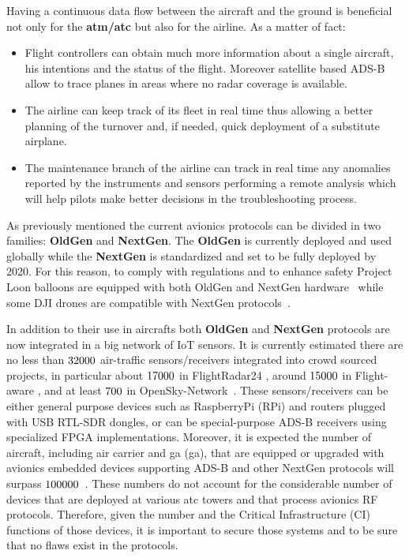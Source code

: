 \documentclass[../main.tex]{subfiles}
\begin{document}
Having a continuous data flow between the aircraft and the ground is beneficial not only for the \textbf{\acrshort{atm}/\acrshort{atc}} but also for the airline. As a matter of fact:
\begin{itemize}
  \item Flight controllers can obtain much more information about a single aircraft, his intentions and the status of the flight. Moreover satellite based ADS-B allow to trace planes in areas where no radar coverage is available.
  \item The airline can keep track of its fleet in real time thus allowing a better planning of the turnover and, if needed, quick deployment of a substitute airplane.
  \item The maintenance branch of the airline can track in real time any anomalies reported by the instruments and sensors performing a remote analysis which will help pilots make better decisions in the troubleshooting process.
\end{itemize}

As previously mentioned the current avionics protocols can be divided in two
families: \textbf{OldGen} and \textbf{NextGen}. The \textbf{OldGen} is currently
deployed and used globally while the \textbf{NextGen} is standardized and set to
be fully deployed by 2020. For this reason, to comply with regulations and to
enhance safety Project Loon balloons are equipped with both OldGen and NextGen
hardware~\cite{loonadsb} while some DJI drones are compatible with NextGen
protocols~\cite{dji}.

In addition to their use in aircrafts both \textbf{OldGen} and \textbf{NextGen} protocols are now
integrated in a big network of IoT sensors. It is currently estimated there are
no less than $32000$ air-traffic sensors/receivers integrated into
crowd sourced projects, in particular about $17000$ in
FlightRadar24 \cite{countFRadar}, around $15000$ in Flight-aware
\cite{countFAware}, and at least $700$ in
OpenSky-Network~\cite{schafer2017opensky}. These sensors/receivers can be either
general purpose devices such as RaspberryPi (RPi) and routers plugged with USB
RTL-SDR dongles, or can be special-purpose ADS-B receivers using specialized
FPGA implementations.
%
Moreover, it is expected the number of aircraft, including air carrier and \acrlong{ga} (\acrshort{ga}), that are equipped or upgraded with avionics embedded devices supporting ADS-B and other NextGen protocols will surpass $100000$~\cite{countFAA}.
These numbers do not account for the considerable number of devices that are deployed at various \acrshort{atc} towers and that process avionics RF protocols. Therefore, given the number and the Critical Infrastructure (CI) functions of those devices, it is important to secure those systems and to be sure that no flaws exist in the protocols.
\end{document}

